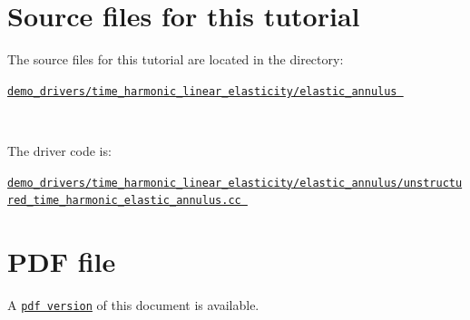  

\hypertarget{index_sources}{}\section{Source files for this tutorial}\label{index_sources}

\begin{DoxyItemize}
\item The source files for this tutorial are located in the directory\+:~\newline
~\newline
\begin{center} \href{../../../../demo_drivers/time_harmonic_linear_elasticity/elastic_annulus/}{\tt demo\+\_\+drivers/time\+\_\+harmonic\+\_\+linear\+\_\+elasticity/elastic\+\_\+annulus } \end{center} ~\newline

\item The driver code is\+: ~\newline
~\newline
\begin{center} \href{../../../../demo_drivers/time_harmonic_linear_elasticity/elastic_annulus/unstructured_time_harmonic_elastic_annulus.cc}{\tt demo\+\_\+drivers/time\+\_\+harmonic\+\_\+linear\+\_\+elasticity/elastic\+\_\+annulus/unstructured\+\_\+time\+\_\+harmonic\+\_\+elastic\+\_\+annulus.\+cc } \end{center} 
\end{DoxyItemize}



 

 \hypertarget{index_pdf}{}\section{P\+D\+F file}\label{index_pdf}
A \href{../latex/refman.pdf}{\tt pdf version} of this document is available. 
